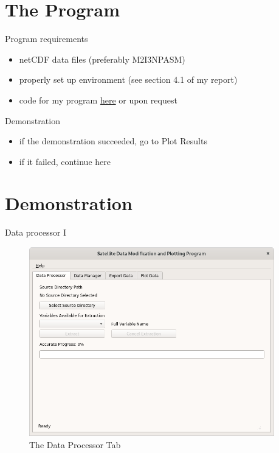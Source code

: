 \documentclass[
    hyperref={
        final,
        colorlinks=true,
        menucolor=black,
        anchorcolor=green,
        linkcolor=blue,
        citecolor=red,
        pdftitle={RS RAS Internship Presentation},
        pdfauthor={Moritz M. Konarski}
    }
]{beamer}
\begin{document}
\section{The Program}

\begin{frame}{Program requirements}
    \begin{itemize}
        \item netCDF data files (preferably M2I3NPASM)
        \item properly set up environment (see section 4.1 of my report)
        \item code for my program
            \href{https://github.com/moritz-konarski/internship}{here} or 
            upon request
    \end{itemize}
\end{frame}

\begin{frame}[fragile]{Demonstration}
    \begin{itemize}
        \item if the demonstration succeeded, go to Plot Results
        \item if it failed, continue here
    \end{itemize}
\end{frame}

\section{Demonstration}

\begin{frame}{Data processor I}
\begin{figure}
    \center
    \includegraphics[width=0.95\textwidth]{../graphics/dp01}
    \vspace{-8pt}
    \caption{The Data Processor Tab}
\end{figure}
\end{frame}
\end{document}
